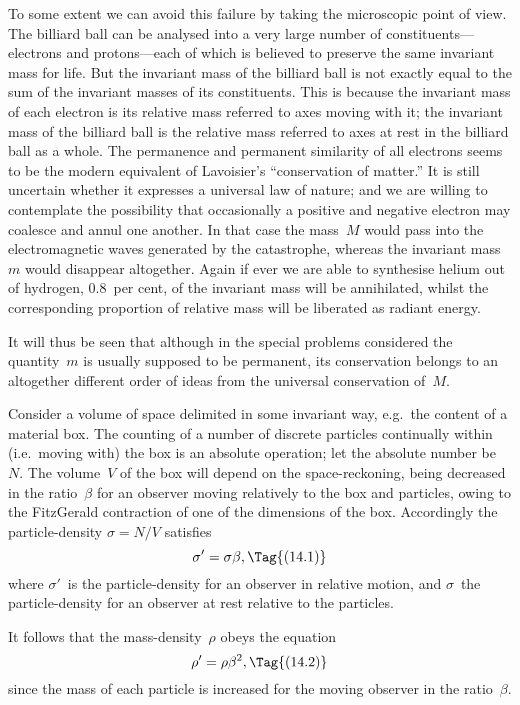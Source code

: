 \documentclass[12pt]{book}
\begin{document}
To some extent we can avoid this failure by taking the microscopic point
of view. The billiard ball can be analysed into a very large number of constituents---electrons
and protons---each of which is believed to preserve the
same invariant mass for life. But the invariant mass of the billiard ball is
not exactly equal to the sum of the invariant masses of its constituents\footnotemark.\footnotetext
  {This is because the invariant mass of each electron is its relative mass referred to axes
  moving with it; the invariant mass of the billiard ball is the relative mass referred to axes at rest
  in the billiard ball as a whole.}
The permanence and permanent similarity of all electrons seems to be the
modern equivalent of Lavoisier's ``conservation of matter.'' It is still uncertain
whether it expresses a universal law of nature; and we are willing to contemplate
the possibility that occasionally a positive and negative electron
may coalesce and annul one another. In that case the mass~$M$ would pass
into the electromagnetic waves generated by the catastrophe, whereas the
invariant mass~$m$ would disappear altogether. Again if ever we are able to
synthesise helium out of hydrogen, $0.8$~per cent, of the invariant mass will
be annihilated, whilst the corresponding proportion of relative mass will be
liberated as radiant energy.

It will thus be seen that although in the special problems considered the
quantity~$m$ is usually supposed to be permanent, its conservation belongs to
an altogether different order of ideas from the universal conservation of~$M$.

%

Consider a volume of space delimited in some invariant way, e.g.\ the
content of a material box. The counting of a number of discrete particles
continually within (i.e.\ moving with) the box is an absolute operation; let
the absolute number be~$N$. The volume~$V$ of the box will depend on the
space-reckoning, being decreased in the ratio~$\beta$ for an observer moving
relatively to the box and particles, owing to the FitzGerald contraction of one
of the dimensions of the box. Accordingly the particle-density $\sigma = N/V$
satisfies
\[
\sigma' = \sigma\beta,
\Tag{(14.1)}
\]
where $\sigma'$~is the particle-density for an observer in relative motion, and $\sigma$~the
particle-density for an observer at rest relative to the particles.

It follows that the mass-density~$\rho$ obeys the equation
\[
\rho' = \rho\beta^{2},
\Tag{(14.2)}
\]
since the mass of each particle is increased for the moving observer in the
ratio~$\beta$.
\end{document}
